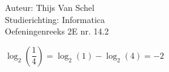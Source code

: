 \documentclass[a4paper]{article}
\begin{document}
  
\noindent \large Auteur: Thijs Van Schel \\
\noindent \large Studierichting: Informatica\\
\noindent \large Oefeningenreeks 2E nr. 14.2\\

\medskip

\normalsize

$\log_{2}\left(\dfrac{1}{4}\right) = \log_{2}(1) - \log_{2}(4) = -2$

\begin{thebibliography}{999}
\end{thebibliography}
\end{document}
